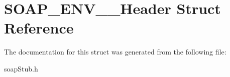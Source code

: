 \hypertarget{structSOAP__ENV____Header}{
\section{SOAP\_\-ENV\_\-\_\-Header Struct Reference}
\label{structSOAP__ENV____Header}
}


The documentation for this struct was generated from the following file:\begin{DoxyCompactItemize}
\item 
soapStub.h\end{DoxyCompactItemize}
